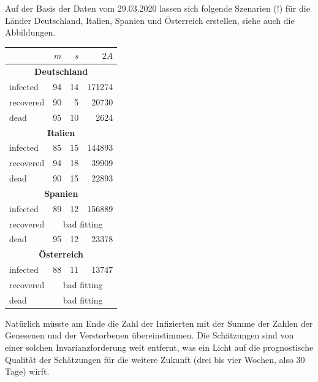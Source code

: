 \documentclass[a4paper,11pt]{article}
\begin{document}
Auf der Basis der Daten vom 29.03.2020 lassen sich folgende Szenarien (!) für
die Länder Deutschland, Italien, Spanien und Österreich erstellen, siehe auch
die Abbildungen.

\begin{center}
  \begin{tabular}{|l|r|r|r|}\hline
    & $m$ & $s$ & $2A$ \\\hline
    \multicolumn{4}{|c|}{\bf Deutschland}\\\hline
    infected   & 94 & 14 & 171274\\
    recovered  & 90 &  5 &  20730\\
    dead       & 95 & 10 &   2624\\\hline
    \multicolumn{4}{|c|}{\bf Italien}\\\hline
    infected   & 85 & 15 & 144893\\
    recovered  & 94 & 18 &  39909\\
    dead       & 90 & 15 &  22893\\\hline
    \multicolumn{4}{|c|}{\bf Spanien}\\\hline
    infected   & 89 & 12 & 156889\\
    recovered  & \multicolumn{3}{|c|}{bad fitting}\\
    dead       & 95 & 12 &  23378\\\hline
    \multicolumn{4}{|c|}{\bf Österreich}\\\hline
    infected   & 88 & 11 &  13747\\
    recovered  & \multicolumn{3}{|c|}{bad fitting}\\
    dead       & \multicolumn{3}{|c|}{bad fitting}\\\hline
  \end{tabular}
\end{center}
Natürlich müsste am Ende die Zahl der Infizierten mit der Summe der Zahlen der
Genesenen und der Verstorbenen übereinstimmen.  Die Schätzungen sind von einer
solchen Invarianzforderung weit entfernt, was ein Licht auf die prognostische
Qualität der Schätzungen für die weitere Zukunft (drei bis vier Wochen, also
30 Tage) wirft.
\end{document}
